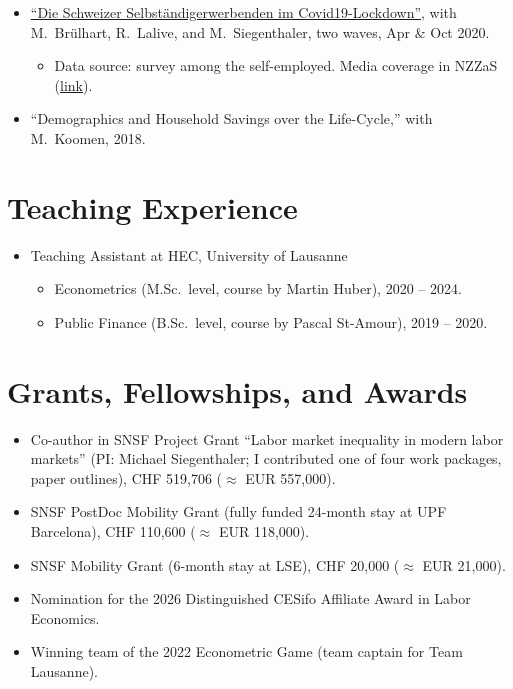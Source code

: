 \documentclass[11pt]{article}
\begin{document}
\begin{itemize}
\begin{itemize}[label=--]
  \item \href{http://swissjobtracker.ch}{Dashboard}; \href{https://github.com/swissjobtracker/chjobtracker}{GitHub page with open-source R code}; media: \href{https://www.swissinfo.ch/fre/toute-l-actu-en-bref/repli-du-nombre-d-offres-d-emplois-en-d\%C3\%A9cembre--\%C3\%A9tude-/48136458}{launch covered on Swissinfo (SRG SSR)}.
  \end{itemize}
\item \href{http://hdl.handle.net/20.500.11850/458349}{``Die Schweizer Selbst\"andigerwerbenden im Covid19-Lockdown''}, with M.~Br\"ulhart, R.~Lalive, and M.~Siegenthaler, two waves, Apr \& Oct 2020.
  \begin{itemize}[label=--]
  \item Data source: survey among the self-employed. Media coverage in NZZaS (\href{https://magazin.nzz.ch/wirtschaft/zweite-welle-viele-selbstaendige-fuerchten-um-ihre-existenz-ld.1589295?reduced=true}{link}).
  \end{itemize}
\item ``Demographics and Household Savings over the Life-Cycle,'' with M.~Koomen, 2018.
\end{itemize}

\section{Teaching Experience}
\begin{itemize}
\item Teaching Assistant at HEC, University of Lausanne
  \begin{itemize}[label=--]
  \item Econometrics (M.Sc.\ level, course by Martin Huber), 2020 -- 2024.
  \item Public Finance (B.Sc.\ level, course by Pascal St-Amour), 2019 -- 2020.
  \end{itemize}
\end{itemize}

\section{Grants, Fellowships, and Awards}
\begin{itemize}
\item Co-author in SNSF Project Grant ``Labor market inequality in modern labor markets'' (PI: Michael Siegenthaler; I contributed one of four work packages, paper outlines), CHF 519,706 ($\approx$ EUR 557,000).
\item SNSF PostDoc Mobility Grant (fully funded 24-month stay at UPF Barcelona), CHF 110,600 ($\approx$ EUR 118,000).
\item SNSF Mobility Grant (6-month stay at LSE), CHF 20,000 ($\approx$ EUR 21,000).
\item Nomination for the 2026 Distinguished CESifo Affiliate Award in Labor Economics.
\item Winning team of the 2022 Econometric Game (team captain for Team Lausanne).
\end{itemize}
\end{document}
